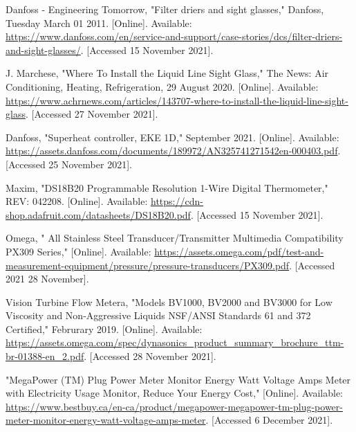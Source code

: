 \documentclass{ucalgarythesis}
\begin{document}
\begin{thebibliography}{9}
     Danfoss - Engineering Tomorrow, "Filter driers and sight glasses," Danfoss, Tuesday March 01 2011. [Online]. Available: \url{https://www.danfoss.com/en/service-and-support/case-stories/dcs/filter-driers-and-sight-glasses/}. [Accessed 15 November 2021].
    
     J. Marchese, "Where To Install the Liquid Line Sight Glass," The News: Air Conditioning, Heating, Refrigeration, 29 August 2020. [Online]. Available: \url{https://www.achrnews.com/articles/143707-where-to-install-the-liquid-line-sight-glass}. [Accessed 27 November 2021].
    
     Danfoss, "Superheat controller, EKE 1D," September 2021. [Online]. Available: \url{https://assets.danfoss.com/documents/189972/AN325741271542en-000403.pdf}. [Accessed 25 November 2021].
    
     Maxim, "DS18B20 Programmable Resolution 1-Wire Digital Thermometer," REV: 042208. [Online]. Available: \url{https://cdn-shop.adafruit.com/datasheets/DS18B20.pdf}. [Accessed 15 November 2021].
    
     Omega, " All Stainless Steel Transducer/Transmitter Multimedia Compatibility PX309 Series," [Online]. Available: \url{https://assets.omega.com/pdf/test-and-measurement-equipment/pressure/pressure-transducers/PX309.pdf}. [Accessed 2021 28 November].
    
     Vision Turbine Flow Metera, "Models BV1000, BV2000 and BV3000 for Low Viscosity and Non-Aggressive Liquids NSF/ANSI Standards 61 and 372 Certified," Februrary 2019. [Online]. Available: \url{https://assets.omega.com/spec/dynasonics_product_summary_brochure_ttm-br-01388-en_2.pdf}. [Accessed 28 November 2021].
    
     "MegaPower (TM) Plug Power Meter Monitor Energy Watt Voltage Amps Meter with Electricity Usage Monitor, Reduce Your Energy Cost," [Online]. Available: \url{https://www.bestbuy.ca/en-ca/product/megapower-megapower-tm-plug-power-meter-monitor-energy-watt-voltage-amps-meter}. [Accessed 6 December 2021].

\end{thebibliography}


\appendix




\end{document}
